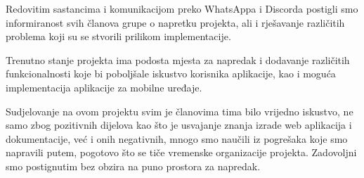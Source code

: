 		 
		 Redovitim sastancima i komunikacijom preko WhatsAppa i Discorda postigli smo informiranost svih članova grupe o napretku projekta, ali i rješavanje različitih problema koji su se stvorili prilikom implementacije.
		 
		 Trenutno stanje projekta ima podosta mjesta za napredak i dodavanje različitih funkcionalnosti koje bi poboljšale iskustvo korisnika aplikacije, kao i moguća implementacija aplikacije za mobilne uređaje.
		 
		 Sudjelovanje na ovom projektu svim je članovima tima bilo vrijedno iskustvo, ne samo zbog pozitivnih dijelova kao što je usvajanje znanja izrade web aplikacija i dokumentacije, već i onih negativnih, mnogo smo naučili iz pogrešaka koje smo napravili putem, pogotovo što se tiče vremenske organizacije projekta. Zadovoljni smo postignutim bez obzira na puno prostora za napredak.
		 
		 
		 
		 
		  
		 
		 
		
		\eject 